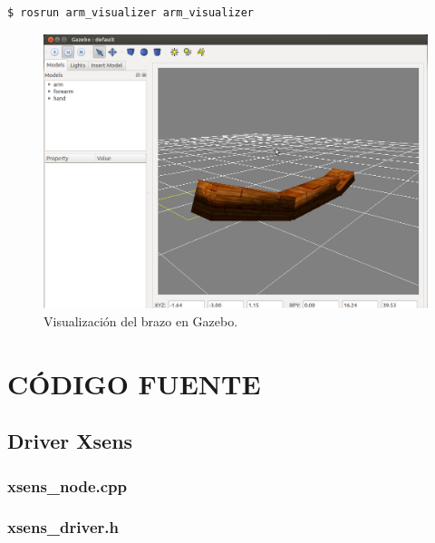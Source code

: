\documentclass[12pt, a4paper]{report}
\begin{document}
\begin{enumerate}
\begin{verbatim}
$ rosrun arm_visualizer arm_visualizer
\end{verbatim}

\begin{figure}
	\centering
		\includegraphics[scale=0.3]{../img/gazebo_arm.png} 
	\caption[Visualización del brazo en Gazebo]{Visualización del brazo en Gazebo.} 
	\label{fig: gazebo_arm}
\end{figure}

\end{enumerate} 

\iffalse

\chapter{CÓDIGO FUENTE}

\section{Driver Xsens}

\subsection{xsens\_node.cpp}
\lstset{inputencoding=utf8/latin1}

\newpage

\subsection{xsens\_driver.h}
\lstset{inputencoding=utf8/latin1}

\newpage
\end{document}
